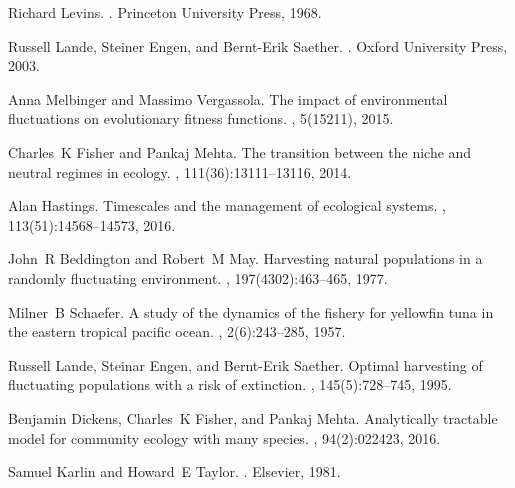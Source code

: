 \begin{thebibliography}{10}
	
	Richard Levins.
	.
	\newblock Princeton University Press, 1968.
	
	Russell Lande, Steiner Engen, and Bernt-Erik Saether.
	.
	\newblock Oxford University Press, 2003.
	
	Anna Melbinger and Massimo Vergassola.
	\newblock The impact of environmental fluctuations on evolutionary fitness
	functions.
	, 5(15211), 2015.
	
	Charles~K Fisher and Pankaj Mehta.
	\newblock The transition between the niche and neutral regimes in ecology.
	,
	111(36):13111--13116, 2014.
	
	Alan Hastings.
	\newblock Timescales and the management of ecological systems.
	,
	113(51):14568--14573, 2016.
	
	John~R Beddington and Robert~M May.
	\newblock Harvesting natural populations in a randomly fluctuating environment.
	, 197(4302):463--465, 1977.
	
	Milner~B Schaefer.
	\newblock A study of the dynamics of the fishery for yellowfin tuna in the
	eastern tropical pacific ocean.
	,
	2(6):243--285, 1957.
	
	Russell Lande, Steinar Engen, and Bernt-Erik Saether.
	\newblock Optimal harvesting of fluctuating populations with a risk of
	extinction.
	, 145(5):728--745, 1995.
	
	Benjamin Dickens, Charles~K Fisher, and Pankaj Mehta.
	\newblock Analytically tractable model for community ecology with many species.
	, 94(2):022423, 2016.
	
	Samuel Karlin and Howard~E Taylor.
	.
	\newblock Elsevier, 1981.
	

\end{thebibliography}
